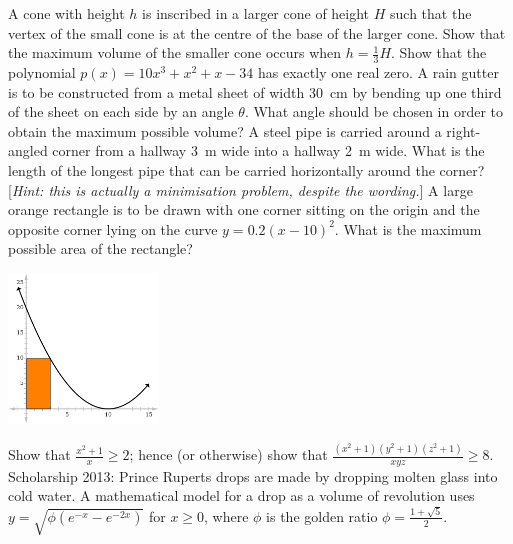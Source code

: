 \begin{questions}
  \questioE A cone with height $ h $ is inscribed in a larger cone of height $ H $ such that the vertex of the small cone
            is at the centre of the base of the larger cone. Show that the maximum volume of the smaller cone occurs when $ h = \frac{1}{3} H $.
  \questioE Show that the polynomial $ p(x) = 10x^3 + x^2 + x - 34 $ has exactly one real zero.
  \questioE A rain gutter is to be constructed from a metal sheet of width \SI{30}{\centi\metre} by bending up
            one third of the sheet on each side by an angle $ \theta $. What angle should be chosen in order to
            obtain the maximum possible volume?
  \questioE A steel pipe is carried around a right-angled corner from a hallway \SI{3}{\metre} wide into a hallway \SI{2}{\metre}
            wide. What is the length of the longest pipe that can be carried horizontally around the corner? [\textit{Hint: this is actually
            a minimisation problem, despite the wording.}]
  \questioE A large orange rectangle is to be drawn with one corner sitting on the origin and the opposite corner lying on
            the curve $ y = 0.2(x - 10)^2 $. What is the maximum possible area of the rectangle?
            \begin{center}
              \includegraphics[width=0.3\textwidth]{paramax}
            \end{center}
  \questioS Show that $ \frac{x^2 + 1}{x} \geq 2 $; hence (or otherwise) show that $ \frac{(x^2 + 1)(y^2 + 1)(z^2 + 1)}{xyz} \geq 8 $.
  \questioS Scholarship 2013: Prince Ruperts drops are made by dropping molten glass into cold water. A mathematical model for a drop
            as a volume of revolution uses $ y = \sqrt{\phi (e^{-x} - e^{-2x})} $ for $ x \geq 0 $, where $ \phi $ is the golden
            ratio $ \phi = \frac{1 + \sqrt{5}}{2} $.
    \begin{parts}

\end{parts}
\end{questions}
